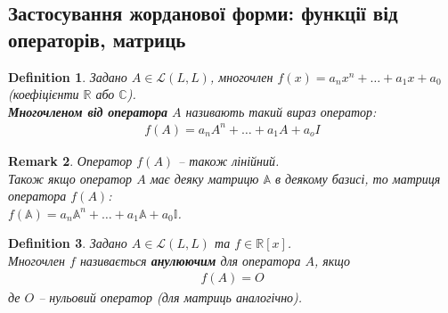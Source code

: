 \documentclass[a4paper, 10pt]{article}
\makeatletter
\theoremstyle{theoremdd}
\newtheorem{theorem}{Theorem}[subsection]
\newtheorem{definition}[theorem]{Definition}
\newtheorem{remark}[theorem]{Remark}
\renewenvironment{proof}[1][Proof.\\]{\par
\pushQED{\hfill \qed}%
\normalfont \topsep6\p@\@plus6\p@\relax
\trivlist
\item\relax
{\bfseries
#1\@addpunct{.}}\hspace\labelsep\ignorespaces
}{%
\popQED\endtrivlist\@endpefalse
}
\makeatother
\begin{document}
\iffalse
\begin{theorem}[Єдиність форми Жордана]
Жорданова форма оператора $A: L \to L$ визначена єдиним чином із точністю до перестановок клітин Жордана.\\
Тобто форма Жордана не залежить від обраного базису власних та приєднаних векторів.
\end{theorem}

\begin{proof}
Кількість клітин для кожного власного числа та заданою розмірністю $k \times k$ визначається числом $R_k$. Отже, для $A$ це визначається однозначно.\\
Наостанок: переставленню клітин у Жорданової формі відповідає переставлення ланцюжків з власного та башти приєднаних до нього векторів.
\end{proof}
\fi

\subsection{Застосування жорданової форми: функції від операторів, матриць}
\begin{definition}
Задано $A \in \mathcal{L}(L,L)$, многочлен $f(x) = a_n x^n + \dots + a_1 x + a_0$ (коефіцієнти $\mathbb{R}$ або $\mathbb{C}$).\\
\textbf{Многочленом від оператора} $A$ називають такий вираз оператор:
\begin{align*}
f(A) = a_n A^n + \dots + a_1 A + a_o I
\end{align*}
\end{definition}

\begin{remark}
Оператор $f(A)$ -- також лінійний.\\
Також якщо оператор $A$ має деяку матрицю $\mathbb{A}$ в деякому базисі, то матриця оператора $f(A)$:\\
$f(\mathbb{A}) = a_n \mathbb{A}^n + \dots + a_1 \mathbb{A} + a_0 \mathbb{I}$.
\end{remark}

\begin{definition}
Задано $A \in \mathcal{L}(L,L)$ та $f \in \mathbb{R}[x]$.\\
Многочлен $f$ називається \textbf{анулюючим} для оператора $A$, якщо
\begin{align*}
f(A) = O
\end{align*}
де $O$ -- нульовий оператор (для матриць аналогічно).
\end{definition}
\end{document}
